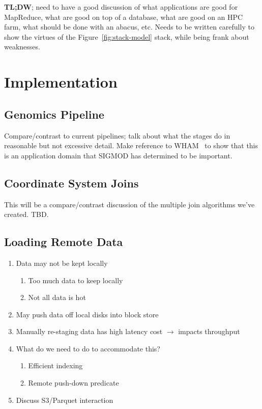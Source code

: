 \documentclass{acm_proc_article-sp}
\begin{document}
\textbf{TL;DW}; need to have a good discussion of what applications are good for MapReduce, what
are good on top of a database, what are good on an HPC farm, what should be done with an
abacus, etc. Needs to be written carefully to show the virtues of the Figure~\ref{fig:stack-model}
stack, while being frank about weaknesses.

\section{Implementation}
\label{sec:implementation}

\subsection{Genomics Pipeline}
\label{sec:genomics-pipeline}

Compare/contrast to current pipelines; talk about what the stages do in reasonable but not
excessive detail. Make reference to WHAM~\cite{li11} to show that this is an application domain that
SIGMOD has determined to be important.

\subsection{Coordinate System Joins}
\label{sec:coordinate-system-joins}

This will be a compare/contrast discussion of the multiple join algorithms we've created. TBD.

\subsection{Loading Remote Data}
\label{sec:loading-remote-data}

\begin{enumerate}
\item Data may not be kept locally
\begin{enumerate}
\item Too much data to keep locally
\item Not all data is hot
\end{enumerate}
\item May push data off local disks into block store
\item Manually re-staging data has high latency cost $\rightarrow$ impacts throughput
\item What do we need to do to accommodate this?
\begin{enumerate}
\item Efficient indexing
\item Remote push-down predicate
\end{enumerate}
\item Discuss S3/Parquet interaction
\end{enumerate}
\end{document}
